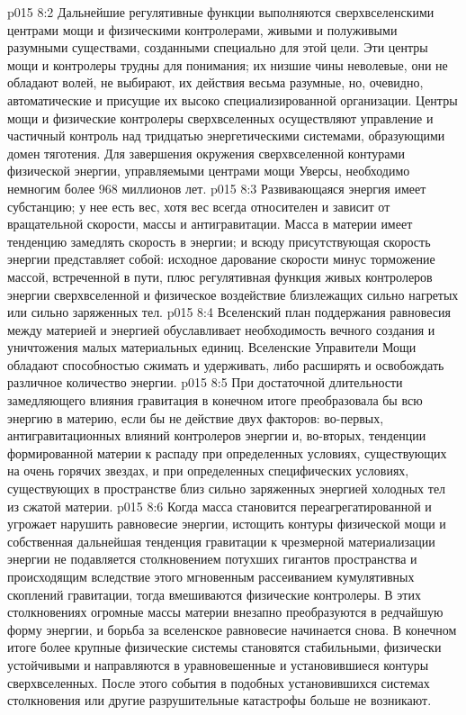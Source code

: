 \vs p015 8:2 Дальнейшие регулятивные функции выполняются сверхвселенскими центрами мощи и физическими контролерами, живыми и полуживыми разумными существами, созданными специально для этой цели. Эти центры мощи и контролеры трудны для понимания; их низшие чины неволевые, они не обладают волей, не выбирают, их действия весьма разумные, но, очевидно, автоматические и присущие их высоко специализированной организации. Центры мощи и физические контролеры сверхвселенных осуществляют управление и частичный контроль над тридцатью энергетическими системами, образующими домен тяготения. Для завершения окружения сверхвселенной контурами физической энергии, управляемыми центрами мощи Уверсы, необходимо немногим более 968 миллионов лет.
\vs p015 8:3 \pc Развивающаяся энергия имеет субстанцию; у нее есть вес, хотя вес всегда относителен и зависит от вращательной скорости, массы и антигравитации. Масса в материи имеет тенденцию замедлять скорость в энергии; и всюду присутствующая скорость энергии представляет собой: исходное дарование скорости минус торможение массой, встреченной в пути, плюс регулятивная функция живых контролеров энергии сверхвселенной и физическое воздействие близлежащих сильно нагретых или сильно заряженных тел.
\vs p015 8:4 Вселенский план поддержания равновесия между материей и энергией обуславливает необходимость вечного создания и уничтожения малых материальных единиц. Вселенские Управители Мощи обладают способностью сжимать и удерживать, либо расширять и освобождать различное количество энергии.
\vs p015 8:5 При достаточной длительности замедляющего влияния гравитация в конечном итоге преобразовала бы всю энергию в материю, если бы не действие двух факторов: во\hyp{}первых, антигравитационных влияний контролеров энергии и, во\hyp{}вторых, тенденции формированной материи к распаду при определенных условиях, существующих на очень горячих звездах, и при определенных специфических условиях, существующих в пространстве близ сильно заряженных энергией холодных тел из сжатой материи.
\vs p015 8:6 Когда масса становится переагрегатированной и угрожает нарушить равновесие энергии, истощить контуры физической мощи и собственная дальнейшая тенденция гравитации к чрезмерной материализации энергии не подавляется столкновением потухших гигантов пространства и происходящим вследствие этого мгновенным рассеиванием кумулятивных скоплений гравитации, тогда вмешиваются физические контролеры. В этих столкновениях огромные массы материи внезапно преобразуются в редчайшую форму энергии, и борьба за вселенское равновесие начинается снова. В конечном итоге более крупные физические системы становятся стабильными, физически устойчивыми и направляются в уравновешенные и установившиеся контуры сверхвселенных. После этого события в подобных установившихся системах столкновения или другие разрушительные катастрофы больше не возникают.

